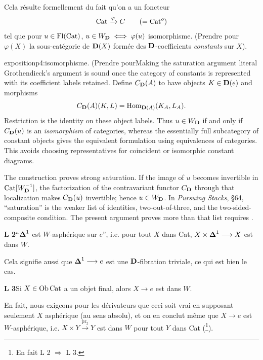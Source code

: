 Cela résulte formellement du fait qu’on a un foncteur
\[
\mathrm{Cat} \xrightarrow{\varphi} C \qquad (= \mathrm{Cat}^o)
\]
tel que pour $u \in \operatorname{Fl}(\mathrm{Cat})$, $u \in W_{\mathbf{D}} \iff \varphi(u)$ isomorphisme. (Prendre pour $\varphi(X)$ la sous-catégorie de $\mathbf{D}(X)$ formée des $\mathbf{D}$-coefficients \textit{constants} sur $X$).

\begin{dcomment}{exposition}{p4:isomorphisme. (Prendre pour}{Making the saturation argument literal}
Grothendieck's argument is sound once the category of constants is represented with its coefficient labels retained. Define $C_{\mathbf{D}}(A)$ to have objects $K\in\mathbf{D}(e)$ and morphisms
\[
 C_{\mathbf{D}}(A)(K,L)=\mathrm{Hom}_{\mathbf{D}(A)}(K_A,L_A).
\]
Restriction is the identity on these object labels. Thus $u\in W_{\mathbf{D}}$ if and only if $C_{\mathbf{D}}(u)$ is an \emph{isomorphism} of categories, whereas the essentially full subcategory of constant objects gives the equivalent formulation using equivalences of categories. This avoids choosing representatives for coincident or isomorphic constant diagrams.

The construction proves strong saturation. If the image of $u$ becomes invertible in $\mathrm{Cat}[W_{\mathbf{D}}^{-1}]$, the factorization of the contravariant functor $C_{\mathbf{D}}$ through that localization makes $C_{\mathbf{D}}(u)$ invertible; hence $u\in W_{\mathbf{D}}$. In \emph{Pursuing Stacks}, \S64, ``saturation'' is the weaker list of identities, two-out-of-three, and the two-sided-composite condition. The present argument proves more than that list requires \citep[\S64, manuscript pp.~163--165]{Grothendieck1983}.
\end{dcomment}


\textbf{L 2}\enspace “$\boldsymbol{\Delta}^1$ est $W$-asphérique sur $e$”, i.e. pour tout $X$ dans Cat, $X \times \boldsymbol{\Delta}^1 \longrightarrow X$ est dans $W$.

Cela signifie aussi que $\boldsymbol{\Delta}^1 \longrightarrow e$ est une $\mathbf{D}$-fibration triviale, ce qui est bien le cas.

\clearpage


\textbf{L 3}\enspace Si $X \in \operatorname{Ob}\mathrm{Cat}$ a un objet final, alors $X \longrightarrow e$ est dans $W$.

En fait, nous exigeons pour les dérivateurs que ceci soit vrai en supposant seulement $X$ asphérique (au sens absolu), et on en conclut même que $X \longrightarrow e$ est $W$-asphérique, i.e. $X \times Y \xrightarrow{\mathrm{pr}_2} Y$ est dans $W$ pour tout $Y$ dans Cat (\footnote{En fait L 2 $\Longrightarrow$ L 3.}).

